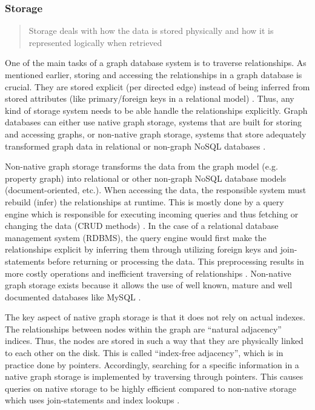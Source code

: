 \subsubsection{Storage}
\blockquote{Storage deals with how the data is stored physically and how it is represented logically when retrieved}\autocite{maheshlal2015}

One of the main tasks of a graph database system is to traverse relationships. As mentioned earlier, storing and accessing the relationships in a graph database is crucial. They are stored explicit (per directed edge) instead of being inferred from stored attributes (like primary/foreign keys in a relational model) \autocite{maheshlal2015} . Thus, any kind of storage system needs to be able handle the relationships explicitly. Graph databases can either use native graph storage, systems that are built for storing and accessing graphs, or non-native graph storage, systems that store adequately transformed graph data in relational or non-graph NoSQL databases \autocite{graphdb2015}.


Non-native graph storage transforms the data from the graph model (e.g. property graph) into relational or other non-graph NoSQL database models (document-oriented, etc.). When accessing the data, the responsible system must rebuild (infer) the relationships at runtime. This is mostly done by a query engine which is responsible for executing incoming queries and thus fetching or changing the data (CRUD methods) \autocite{maheshlal2015} . In the case of a relational database management system (RDBMS), the query engine would first make the relationships explicit by inferring them through utilizing foreign keys and join-statements before returning or processing the data. This preprocessing results in more costly operations and inefficient traversing of relationships \autocite{maheshlal2015}. Non-native graph storage exists because it allows the use of well known, mature and well documented databases like MySQL \autocite{graphdb2015}.


The key aspect of native graph storage is that it does not rely on actual indexes. The relationships between nodes within the graph are “natural adjacency”\autocite{graphdb2015}  indices. Thus, the nodes are stored in such a way that they are physically linked to each other on the disk. This is called “index-free adjacency”\autocite{graphdb2015}, which is in practice done by pointers. Accordingly, searching for a specific information in a native graph storage is implemented by traversing through pointers. This causes queries on native storage to be highly efficient compared to non-native storage which uses join-statements and index lookups \autocite{graphdb2015} .

